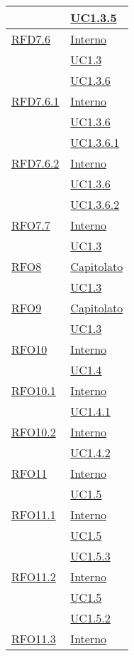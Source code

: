 \begin{longtable}{|>{\centering}m{5cm}|m{5cm}<{\centering}|}
& \hyperref[UC1.3.5]{UC1.3.5}\\ \hline
\hyperlink{RFD7.6}{RFD7.6} & \hyperlink{Interno}{Interno}\\
& \hyperref[UC1.3]{UC1.3}\\
& \hyperref[UC1.3.6]{UC1.3.6}\\ \hline
\hyperlink{RFD7.6.1}{RFD7.6.1} & \hyperlink{Interno}{Interno}\\
& \hyperref[UC1.3.6]{UC1.3.6}\\
& \hyperref[UC1.3.6.1]{UC1.3.6.1}\\ \hline
\hyperlink{RFD7.6.2}{RFD7.6.2} & \hyperlink{Interno}{Interno}\\
& \hyperref[UC1.3.6]{UC1.3.6}\\
& \hyperref[UC1.3.6.2]{UC1.3.6.2}\\ \hline
\hyperlink{RFO7.7}{RFO7.7} & \hyperlink{Interno}{Interno}\\
& \hyperref[UC1.3]{UC1.3}\\ \hline
\hyperlink{RFO8}{RFO8} & \hyperlink{Capitolato}{Capitolato}\\
& \hyperref[UC1.3]{UC1.3}\\ \hline
\hyperlink{RFO9}{RFO9} & \hyperlink{Capitolato}{Capitolato}\\
& \hyperref[UC1.3]{UC1.3}\\ \hline
\hyperlink{RFO10}{RFO10} & \hyperlink{Interno}{Interno}\\
& \hyperref[UC1.4]{UC1.4}\\ \hline
\hyperlink{RFO10.1}{RFO10.1} & \hyperlink{Interno}{Interno}\\
& \hyperref[UC1.4.1]{UC1.4.1}\\ \hline
\hyperlink{RFO10.2}{RFO10.2} & \hyperlink{Interno}{Interno}\\
& \hyperref[UC1.4.2]{UC1.4.2}\\ \hline
\hyperlink{RFO11}{RFO11} & \hyperlink{Interno}{Interno}\\
& \hyperref[UC1.5]{UC1.5}\\ \hline
\hyperlink{RFO11.1}{RFO11.1} & \hyperlink{Interno}{Interno}\\
& \hyperref[UC1.5]{UC1.5}\\
& \hyperref[UC1.5.3]{UC1.5.3}\\ \hline
\hyperlink{RFO11.2}{RFO11.2} & \hyperlink{Interno}{Interno}\\
& \hyperref[UC1.5]{UC1.5}\\
& \hyperref[UC1.5.2]{UC1.5.2}\\ \hline
\hyperlink{RFO11.3}{RFO11.3} & \hyperlink{Interno}{Interno}\\

\end{longtable}
